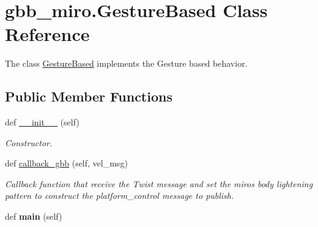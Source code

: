 \hypertarget{classgbb__miro_1_1GestureBased}{}\section{gbb\+\_\+miro.\+Gesture\+Based Class Reference}
\label{classgbb__miro_1_1GestureBased}


The class \mbox{\hyperlink{classgbb__miro_1_1GestureBased}{Gesture\+Based}} implements the Gesture based behavior.  


\subsection*{Public Member Functions}
\begin{DoxyCompactItemize}
\item 
\mbox{\label{classgbb__miro_1_1GestureBased_a07f79eb00b603ad746d6207e90cb7a7c}} 
def \mbox{\hyperlink{classgbb__miro_1_1GestureBased_a07f79eb00b603ad746d6207e90cb7a7c}{\+\_\+\+\_\+init\+\_\+\+\_\+}} (self)
\begin{DoxyCompactList}\small\item\em Constructor. \end{DoxyCompactList}\item 
\mbox{\label{classgbb__miro_1_1GestureBased_a8e1b7b744c86c469224b221ba048c1eb}} 
def \mbox{\hyperlink{classgbb__miro_1_1GestureBased_a8e1b7b744c86c469224b221ba048c1eb}{callback\+\_\+gbb}} (self, vel\+\_\+msg)
\begin{DoxyCompactList}\small\item\em Callback function that receive the Twist message and set the miro\textquotesingle{}s body lightening pattern to construct the platform\+\_\+control message to publish. \end{DoxyCompactList}\item 
\mbox{\label{classgbb__miro_1_1GestureBased_a47f54767f7a09c1e316bfe935c553eb5}} 
def {\bfseries main} (self)
\end{DoxyCompactItemize}
